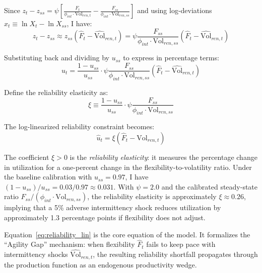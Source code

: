 \documentclass[12pt, a4paper]{article}
\begin{document}
Since $z_t - z_{ss} = \psi \left[\frac{F_t}{\phi_{int} \cdot \text{Vol}_{ren,t}} - \frac{F_{ss}}{\phi_{int} \cdot \text{Vol}_{ren,ss}}\right]$ and using log-deviations $\hat{x}_t \equiv \ln X_t - \ln X_{ss}$, I have:
\begin{equation}
z_t - z_{ss} \approx z_{ss}(\hat{F}_t - \hat{\text{Vol}}_{ren,t}) = \psi \frac{F_{ss}}{\phi_{int} \cdot \text{Vol}_{ren,ss}}(\hat{F}_t - \hat{\text{Vol}}_{ren,t})
\end{equation}

Substituting back and dividing by $u_{ss}$ to express in percentage terms:
\begin{equation}
\hat{u}_t = \frac{1-u_{ss}}{u_{ss}} \cdot \psi \frac{F_{ss}}{\phi_{int} \cdot \text{Vol}_{ren,ss}} (\hat{F}_t - \hat{\text{Vol}}_{ren,t})
\end{equation}

Define the reliability elasticity as:
\begin{equation}
\xi \equiv \frac{1-u_{ss}}{u_{ss}} \cdot \psi \frac{F_{ss}}{\phi_{int} \cdot \text{Vol}_{ren,ss}}
\end{equation}

The log-linearized reliability constraint becomes:
\begin{equation}
\boxed{
\hat{u}_t = \xi \left(\hat{F}_t - \hat{\text{Vol}}_{ren,t}\right)
}
\label{eq:reliability_lin}
\end{equation}

The coefficient $\xi > 0$ is the \textit{reliability elasticity}: it measures the percentage change in utilization for a one-percent change in the flexibility-to-volatility ratio. Under the baseline calibration with $u_{ss} = 0.97$, I have $(1-u_{ss})/u_{ss} = 0.03/0.97 \approx 0.031$. With $\psi = 2.0$ and the calibrated steady-state ratio $F_{ss}/(\phi_{int} \cdot \text{Vol}_{ren,ss})$, the reliability elasticity is approximately $\xi \approx 0.26$, implying that a 5\% adverse intermittency shock reduces utilization by approximately 1.3 percentage points if flexibility does not adjust.

Equation~\eqref{eq:reliability_lin} is the core equation of the model. It formalizes the ``Agility Gap'' mechanism: when flexibility $\hat{F}_t$ fails to keep pace with intermittency shocks $\hat{\text{Vol}}_{ren,t}$, the resulting reliability shortfall propagates through the production function as an endogenous productivity wedge.
\end{document}
